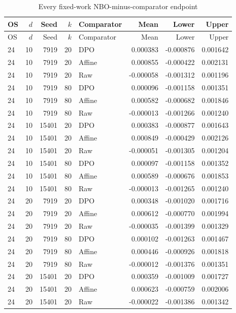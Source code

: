 \begingroup\small\setlength{\tabcolsep}{3pt}
\begin{longtable}{lrrrlrrr}
\caption{Every fixed-work NBO-minus-comparator endpoint}\label{tab:r14pairs}\\
\toprule
OS & $d$ & Seed & $k$ & Comparator & Mean & Lower & Upper\\\midrule
\endfirsthead
\toprule
OS & $d$ & Seed & $k$ & Comparator & Mean & Lower & Upper\\\midrule
\endhead
24 & 10 & 7919 & 20 & DPO & 0.000383 & -0.000876 & 0.001642\\
24 & 10 & 7919 & 20 & Affine & 0.000855 & -0.000422 & 0.002131\\
24 & 10 & 7919 & 20 & Raw & -0.000058 & -0.001312 & 0.001196\\
24 & 10 & 7919 & 80 & DPO & 0.000096 & -0.001158 & 0.001351\\
24 & 10 & 7919 & 80 & Affine & 0.000582 & -0.000682 & 0.001846\\
24 & 10 & 7919 & 80 & Raw & -0.000013 & -0.001266 & 0.001240\\
24 & 10 & 15401 & 20 & DPO & 0.000383 & -0.000877 & 0.001643\\
24 & 10 & 15401 & 20 & Affine & 0.000849 & -0.000429 & 0.002126\\
24 & 10 & 15401 & 20 & Raw & -0.000051 & -0.001305 & 0.001204\\
24 & 10 & 15401 & 80 & DPO & 0.000097 & -0.001158 & 0.001352\\
24 & 10 & 15401 & 80 & Affine & 0.000589 & -0.000676 & 0.001853\\
24 & 10 & 15401 & 80 & Raw & -0.000013 & -0.001265 & 0.001240\\
24 & 20 & 7919 & 20 & DPO & 0.000348 & -0.001020 & 0.001716\\
24 & 20 & 7919 & 20 & Affine & 0.000612 & -0.000770 & 0.001994\\
24 & 20 & 7919 & 20 & Raw & -0.000035 & -0.001399 & 0.001329\\
24 & 20 & 7919 & 80 & DPO & 0.000102 & -0.001263 & 0.001467\\
24 & 20 & 7919 & 80 & Affine & 0.000446 & -0.000926 & 0.001818\\
24 & 20 & 7919 & 80 & Raw & -0.000012 & -0.001376 & 0.001351\\
24 & 20 & 15401 & 20 & DPO & 0.000359 & -0.001009 & 0.001727\\
24 & 20 & 15401 & 20 & Affine & 0.000623 & -0.000759 & 0.002006\\
24 & 20 & 15401 & 20 & Raw & -0.000022 & -0.001386 & 0.001342\\

\end{longtable}
